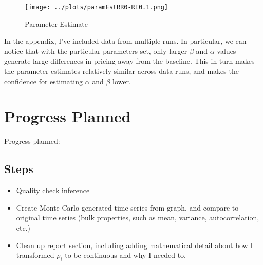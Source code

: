 \documentclass[a4paper, 11pt]{report}
\begin{document}
\begin{figure}[h!]
	\caption{Parameter Estimate}
	\label{ex_paramEst}
	\texttt{[image: ../plots/paramEstRR0-RI0.1.png]}
\end{figure}

In the appendix, I've included data from multiple runs. In particular, we can notice that with the particular parameters set, only larger $\beta$ and $\alpha$ values generate large differences in pricing away from the baseline. This in turn makes the parameter estimates relatively similar across data runs, and makes the confidence for estimating $\alpha$ and $\beta$ lower. 

\chapter{Progress Planned}



\noindent Progress planned:
\section{Steps}
\begin{itemize}
\item Quality check inference
\item Create Monte Carlo generated time series from graph, and compare to original time series (bulk properties, such as mean, variance, autocorrelation, etc.)
\item Clean up report section, including adding mathematical detail about how I transformed $\rho_{i}$ to be continuous and why I needed to.
\end{itemize}
\end{document}
